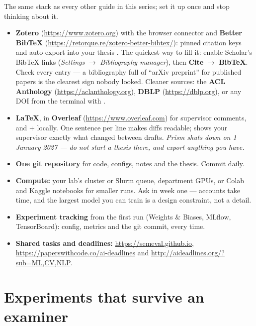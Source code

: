 \documentclass[11pt,a4paper]{article}
\begin{document}
The same stack as every other guide in this series; set it up once and stop
thinking about it.

\begin{itemize}
  \item \textbf{Zotero} (\url{https://www.zotero.org}) with the browser
        connector and \textbf{Better BibTeX}
        (\url{https://retorque.re/zotero-better-bibtex/}): pinned citation
        keys and auto-export into your thesis .
        The quickest way to fill it: enable Scholar's BibTeX links
        (\emph{Settings} $\rightarrow$ \emph{Bibliography manager}), then
        \textbf{Cite} $\rightarrow$ \textbf{BibTeX}. Check every entry --- a
        bibliography full of ``arXiv preprint'' for published papers is the
        clearest sign nobody looked. Cleaner sources: the \textbf{ACL
        Anthology} (\url{https://aclanthology.org}), \textbf{DBLP}
        (\url{https://dblp.org}), or any DOI from the terminal with
        .
  \item \textbf{LaTeX}, in \textbf{Overleaf}
        (\url{https://www.overleaf.com}) for supervisor comments, and
         +  locally. One sentence per line makes diffs
        readable;  shows your supervisor exactly what changed
        between drafts. \emph{Prism shuts down on 1 January 2027 --- do not
        start a thesis there, and export anything you have.}
  \item \textbf{One git repository} for code, configs, notes and the thesis.
        Commit daily.
  \item \textbf{Compute:} your lab's cluster or Slurm queue, department GPUs,
        or Colab and Kaggle notebooks for smaller runs. Ask in week one ---
        accounts take time, and the largest model you can train is a design
        constraint, not a detail.
  \item \textbf{Experiment tracking} from the first run (Weights \& Biases,
        MLflow, TensorBoard): config, metrics and the git commit, every time.
  \item \textbf{Shared tasks and deadlines:}
        \url{https://semeval.github.io},
        \url{https://paperswithcode.co/ai-deadlines} and
        \url{http://aideadlines.org/?sub=ML,CV,NLP}.
\end{itemize}

\section{Experiments that survive an examiner}
\end{document}
